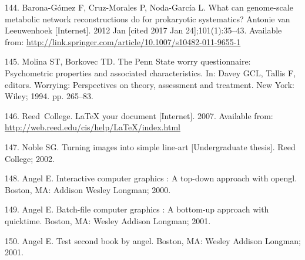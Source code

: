 \documentclass[12pt,twoside]{reedthesis}
\begin{document}
  \hypertarget{ref-barona-gomez_what_2012}{}
  144. Barona-Gómez F, Cruz-Morales P, Noda-García L. What can
  genome-scale metabolic network reconstructions do for prokaryotic
  systematics? Antonie van Leeuwenhoek {[}Internet{]}. 2012 Jan {[}cited
  2017 Jan 24{]};101(1):35--43. Available from:
  \url{http://link.springer.com/article/10.1007/s10482-011-9655-1}
  
  \hypertarget{ref-Molina1994}{}
  145. Molina ST, Borkovec TD. The Penn State worry questionnaire:
  Psychometric properties and associated characteristics. In: Davey GCL,
  Tallis F, editors. Worrying: Perspectives on theory, assessment and
  treatment. New York: Wiley; 1994. pp. 265--83.
  
  \hypertarget{ref-reedweb2007}{}
  146. Reed~College. LaTeX your document {[}Internet{]}. 2007. Available
  from: \url{http://web.reed.edu/cis/help/LaTeX/index.html}
  
  \hypertarget{ref-noble2002}{}
  147. Noble SG. Turning images into simple line-art {[}Undergraduate
  thesis{]}. Reed College; 2002.
  
  \hypertarget{ref-angel2000}{}
  148. Angel E. Interactive computer graphics : A top-down approach with
  opengl. Boston, MA: Addison Wesley Longman; 2000.
  
  \hypertarget{ref-angel2001}{}
  149. Angel E. Batch-file computer graphics : A bottom-up approach with
  quicktime. Boston, MA: Wesley Addison Longman; 2001.
  
  \hypertarget{ref-angel2002a}{}
  150. Angel E. Test second book by angel. Boston, MA: Wesley Addison
  Longman; 2001.


\end{document}
